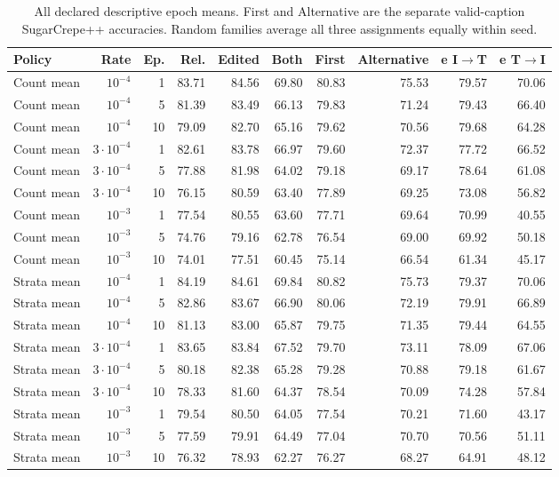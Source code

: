 \begin{table}[t]
\nolinenumbers
\centering
\small
\setlength{\tabcolsep}{3pt}
\begin{tabular}{lrrrrrrrrr}
\toprule
Policy & Rate & Ep. & Rel. & Edited & Both & First & Alternative & e I$\to$T & e T$\to$I\\
\midrule
Count mean & $10^{-4}$ & 1 & 83.71 & 84.56 & 69.80 & 80.83 & 75.53 & 79.57 & 70.06\\
Count mean & $10^{-4}$ & 5 & 81.39 & 83.49 & 66.13 & 79.83 & 71.24 & 79.43 & 66.40\\
Count mean & $10^{-4}$ & 10 & 79.09 & 82.70 & 65.16 & 79.62 & 70.56 & 79.68 & 64.28\\
Count mean & $3\cdot10^{-4}$ & 1 & 82.61 & 83.78 & 66.97 & 79.60 & 72.37 & 77.72 & 66.52\\
Count mean & $3\cdot10^{-4}$ & 5 & 77.88 & 81.98 & 64.02 & 79.18 & 69.17 & 78.64 & 61.08\\
Count mean & $3\cdot10^{-4}$ & 10 & 76.15 & 80.59 & 63.40 & 77.89 & 69.25 & 73.08 & 56.82\\
Count mean & $10^{-3}$ & 1 & 77.54 & 80.55 & 63.60 & 77.71 & 69.64 & 70.99 & 40.55\\
Count mean & $10^{-3}$ & 5 & 74.76 & 79.16 & 62.78 & 76.54 & 69.00 & 69.92 & 50.18\\
Count mean & $10^{-3}$ & 10 & 74.01 & 77.51 & 60.45 & 75.14 & 66.54 & 61.34 & 45.17\\
Strata mean & $10^{-4}$ & 1 & 84.19 & 84.61 & 69.84 & 80.82 & 75.73 & 79.37 & 70.06\\
Strata mean & $10^{-4}$ & 5 & 82.86 & 83.67 & 66.90 & 80.06 & 72.19 & 79.91 & 66.89\\
Strata mean & $10^{-4}$ & 10 & 81.13 & 83.00 & 65.87 & 79.75 & 71.35 & 79.44 & 64.55\\
Strata mean & $3\cdot10^{-4}$ & 1 & 83.65 & 83.84 & 67.52 & 79.70 & 73.11 & 78.09 & 67.06\\
Strata mean & $3\cdot10^{-4}$ & 5 & 80.18 & 82.38 & 65.28 & 79.28 & 70.88 & 79.18 & 61.67\\
Strata mean & $3\cdot10^{-4}$ & 10 & 78.33 & 81.60 & 64.37 & 78.54 & 70.09 & 74.28 & 57.84\\
Strata mean & $10^{-3}$ & 1 & 79.54 & 80.50 & 64.05 & 77.54 & 70.21 & 71.60 & 43.17\\
Strata mean & $10^{-3}$ & 5 & 77.59 & 79.91 & 64.49 & 77.04 & 70.70 & 70.56 & 51.11\\
Strata mean & $10^{-3}$ & 10 & 76.32 & 78.93 & 62.27 & 76.27 & 68.27 & 64.91 & 48.12\\
\bottomrule
\end{tabular}
\caption{All declared descriptive epoch means. First and Alternative are the separate valid-caption SugarCrepe++ accuracies. Random families average all three assignments equally within seed.}\label{tab:futraj1}
\end{table}
